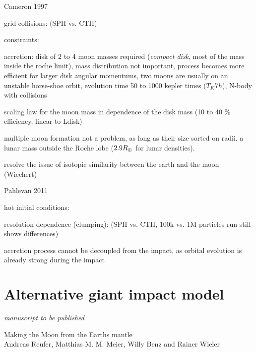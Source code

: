 \citep{Canup:2005p1987}
\citep{Canup:2008p3551}
\cite{1997Icar..126..126C} Cameron 1997


grid collisions:
\cite{Wada:2006p1013}
\citep{Canup:2010p3713} (SPH vs. CTH)

constraints:
\cite{Wiechert:2001p3543}
\cite{Stevenson:1987p3540}

accretion:
\citep{Kokubo:2000p2195}
disk of 2 to 4 moon masses required (\emph{compact disk}, most of the mass inside the roche limit), mass distribution not important, process becomes more efficient for larger disk angular momentums, two moons are usually on an unstable horse-shoe orbit, evolution time 50 to 1000 kepler times ($T_K 7h$), N-body with collisions

\citep{Ida:1997p3395} scaling law for the moon mass in dependence of the disk mass (10 to 40 \% efficiency, linear to Ldisk)

\cite{Canup:1996p3541} multiple moon formation not a problem, as long as their size sorted on radii. a lunar mass outside the Roche lobe ($2.9 R_{\oplus}$ for lunar densities).

\citep{Pahlevan:2007p2065}
resolve the issue of isotopic similarity between the earth and the moon (Wiechert) 


\cite{2011E&PSL.301..433P} Pahlevan 2011

hot initial conditions:
\citep{2000orem.book..179P}

resolution dependence (clumping):
\citep{Canup:2010p3713} (SPH vs. CTH, 100k vs. 1M particles run still shows differences)



accretion process cannot be decoupled from the impact, as orbital evolution is already strong during the impact

\section{Alternative giant impact model}




\clearpage
\thispagestyle{empty}
\begin{flushright} \emph{manuscript to be published} \end{flushright}
{\Large Making the Moon from the Earths mantle} \vspace{0.5cm}\\
Andreas Reufer, Matthias M. M. Meier, Willy Benz and Rainer Wieler\\

